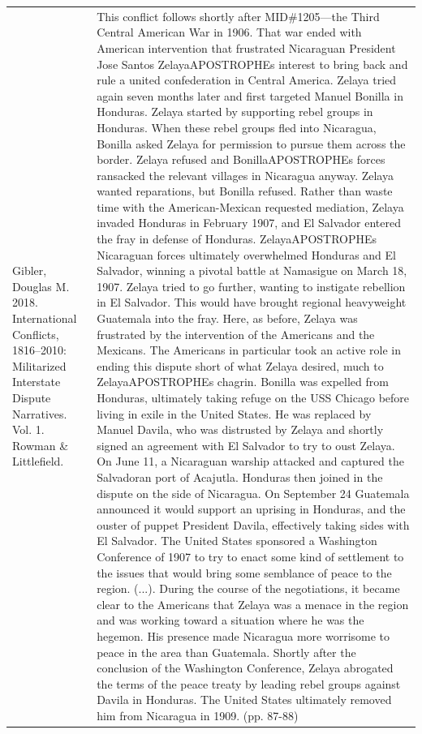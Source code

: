 {\begin{longtable}{p{}p{}}
Gibler, Douglas M. 2018. International Conflicts, 1816–2010: Militarized Interstate Dispute Narratives. Vol. 1. Rowman \& Littlefield. & This conflict follows shortly after MID\#1205—the Third Central American War in 1906. That war ended with American intervention that frustrated Nicaraguan President Jose Santos ZelayaAPOSTROPHEs interest to bring back and rule a united confederation in Central America. Zelaya tried again seven months later and first targeted Manuel Bonilla in Honduras. Zelaya started by supporting rebel groups in Honduras. When these rebel groups fled into Nicaragua, Bonilla asked Zelaya for permission to pursue them across the border. Zelaya refused and BonillaAPOSTROPHEs forces ransacked the relevant villages in Nicaragua anyway. Zelaya wanted reparations, but Bonilla refused. Rather than waste time with the American-Mexican requested mediation, Zelaya invaded Honduras in February 1907, and El Salvador entered the fray in defense of Honduras. ZelayaAPOSTROPHEs Nicaraguan forces ultimately overwhelmed Honduras and El Salvador, winning a pivotal battle at Namasigue on March 18, 1907. Zelaya tried to go further, wanting to instigate rebellion in El Salvador. This would have brought regional heavyweight Guatemala into the fray. Here, as before, Zelaya was frustrated by the intervention of the Americans and the Mexicans. The Americans in particular took an active role in ending this dispute short of what Zelaya desired, much to ZelayaAPOSTROPHEs chagrin. Bonilla was expelled from Honduras, ultimately taking refuge on the USS Chicago before living in exile in the United States. He was replaced by Manuel Davila, who was distrusted by Zelaya and shortly signed an agreement with El Salvador to try to oust Zelaya. On June 11, a Nicaraguan warship attacked and captured the Salvadoran port of Acajutla. Honduras then joined in the dispute on the side of Nicaragua. On September 24 Guatemala announced it would support an uprising in Honduras, and the ouster of puppet President Davila, effectively taking sides with El Salvador. The United States sponsored a Washington Conference of 1907 to try to enact some kind of settlement to the issues that would bring some semblance of peace to the region. (...). During the course of the negotiations, it became clear to the Americans that Zelaya was a menace in the region and was working toward a situation where he was the hegemon. His presence made Nicaragua more worrisome to peace in the area than Guatemala. Shortly after the conclusion of the Washington Conference, Zelaya abrogated the terms of the peace treaty by leading rebel groups against Davila in Honduras. The United States ultimately removed him from Nicaragua in 1909. (pp. 87-88)

\end{longtable}}
